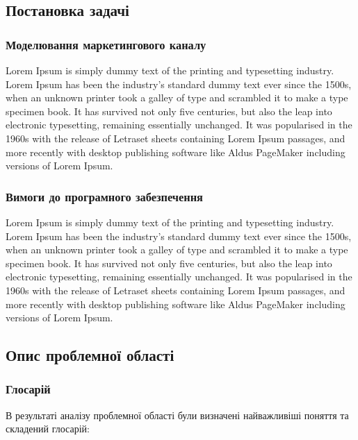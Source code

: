 \subsection{Постановка задачі}
\subsubsection{Моделювання маркетингового каналу}
Lorem Ipsum is simply dummy text of the printing and typesetting industry. Lorem Ipsum has been the industry's standard dummy text ever since the 1500s, when an unknown printer took a galley of type and scrambled it to make a type specimen book. It has survived not only five centuries, but also the leap into electronic typesetting, remaining essentially unchanged. It was popularised in the 1960s with the release of Letraset sheets containing Lorem Ipsum passages, and more recently with desktop publishing software like Aldus PageMaker including versions of Lorem Ipsum.

\subsubsection{Вимоги до програмного забезпечення}
Lorem Ipsum is simply dummy text of the printing and typesetting industry. Lorem Ipsum has been the industry's standard dummy text ever since the 1500s, when an unknown printer took a galley of type and scrambled it to make a type specimen book. It has survived not only five centuries, but also the leap into electronic typesetting, remaining essentially unchanged. It was popularised in the 1960s with the release of Letraset sheets containing Lorem Ipsum passages, and more recently with desktop publishing software like Aldus PageMaker including versions of Lorem Ipsum.
              
\subsection{Опис проблемної області}
\subsubsection{Глосарій}
В результаті аналізу проблемної області були визначені найважливіші поняття та складений глосарій:
            
